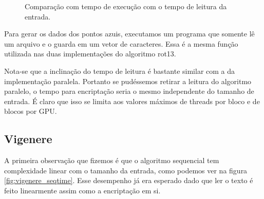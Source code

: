 \documentclass[12pt]{article}
\begin{document}
\begin{figure}[H]
    \caption{Comparação com tempo de execução com o tempo de 
        leitura da entrada.}
    \label{fig:read_operation_time}
\end{figure}

Para gerar os dados dos pontos azuis, executamos um programa que somente
lê um arquivo e o guarda em um vetor de caracteres. Essa é a mesma
função utilizada nas duas implementações do algoritmo rot13. 

Nota-se que a inclinação do tempo de leitura é bastante similar com a da
implementação paralela. Portanto se pudéssemos retirar a leitura do 
algoritmo paralelo, o tempo para encriptação seria o mesmo independente
do tamanho de entrada. É claro que isso se limita aos valores máximos
de threads por bloco e de blocos por GPU. 

\subsection{Vigenere}
A primeira observação que fizemos é que o algoritmo sequencial tem 
complexidade linear com o tamanho da entrada, como podemos ver na 
figura \ref{fig:vigenere_seqtime}. Esse desempenho já era 
esperado dado que ler o texto é feito linearmente assim como a 
encriptação em si.
\end{document}
